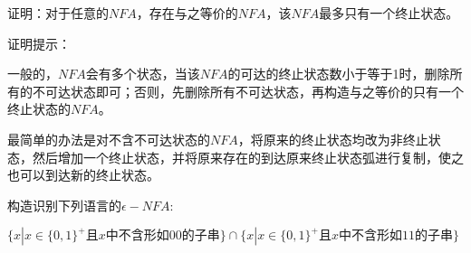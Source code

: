 \begin{exercise}
	证明：对于任意的$NFA$，存在与之等价的$NFA$，该$NFA$最多只有一个终止状态。
\end{exercise}

\begin{solution}
	证明提示：
	
	一般的，$NFA$会有多个状态，当该$NFA$的可达的终止状态数小于等于1时，删除所有的不可达状态即可；否则，先删除所有不可达状态，再构造与之等价的只有一个终止状态的$NFA$。
	
	最简单的办法是对不含不可达状态的$NFA$，将原来的终止状态均改为非终止状态，然后增加一个终止状态，并将原来存在的到达原来终止状态弧进行复制，使之也可以到达新的终止状态。
\end{solution}

\begin{exercise}构造识别下列语言的$\epsilon-NFA$:
	
	$\{x|x\in\{0,1\}^+\text{且$x$中不含形如$00$的子串}\}\cap\{x|x\in\{0,1\}^+\text{且$x$中不含形如$11$的子串}\}$
\end{exercise}

